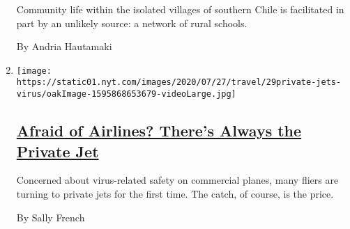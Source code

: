 \begin{enumerate}
  Community life within the isolated villages of southern Chile is
  facilitated in part by an unlikely source: a network of rural schools.

  By Andria Hautamaki
\item
  \texttt{[image: https://static01.nyt.com/images/2020/07/27/travel/29private-jets-virus/oakImage-1595868653679-videoLarge.jpg]}

  \hypertarget{afraid-of-airlines-theres-always-the-private-jet}{%
  \subsection{\texorpdfstring{\href{/2020/07/30/travel/private-jets-coronavirus.html}{Afraid
  of Airlines? There's Always the Private
  Jet}}{Afraid of Airlines? There's Always the Private Jet}}\label{afraid-of-airlines-theres-always-the-private-jet}}

  Concerned about virus-related safety on commercial planes, many fliers
  are turning to private jets for the first time. The catch, of course,
  is the price.

  By Sally French
\end{enumerate}

